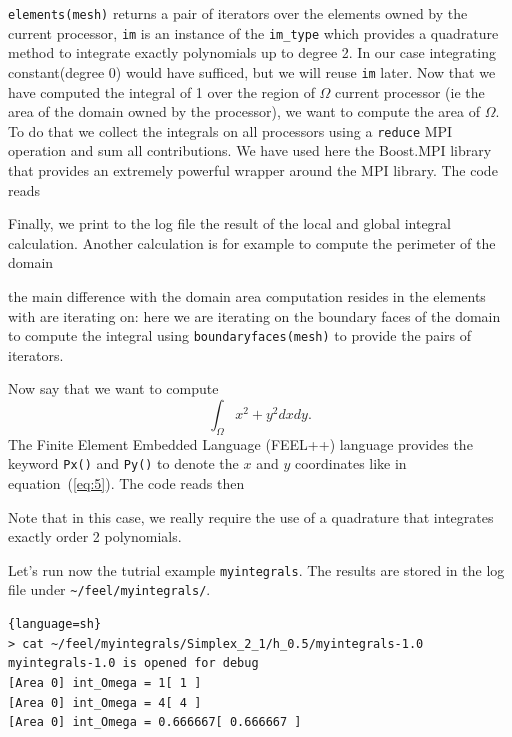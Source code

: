 \lstinline!elements(mesh)! returns a pair of iterators over the
elements owned by the current processor, \lstinline!im! is an instance
of the \lstinline!im_type! which provides a quadrature method to
integrate exactly polynomials up to degree 2. In our case integrating
constant(degree 0) would have sufficed, but we will reuse
\lstinline!im! later. Now that we have computed the integral of 1 over
the region of $\Omega$ current processor (ie the area of the domain
owned by the processor), we want to compute the area of $\Omega$. To
do that we collect the integrals on all processors using a
\lstinline!reduce! MPI operation and sum all contributions. We have
used here the Boost.MPI library that provides an extremely powerful
\cpp wrapper around the MPI library. The code reads



\noindent
Finally, we print to the log file the result of the local and global
integral calculation. Another calculation is for example to compute
the perimeter of the domain



\noindent
the main difference with the domain area computation resides in the
elements with are iterating on: here we are iterating on the boundary
faces of the domain to compute the integral using
\lstinline!boundaryfaces(mesh)! to provide the pairs of iterators.


Now say that we want to compute
\begin{equation}
  \label{eq:5}
  \int_\Omega x^2 + y^2 dx dy.
\end{equation}
The Finite Element Embedded Language (FEEL++) language provides the
keyword \lstinline!Px()! and \lstinline!Py()! to denote the $x$ and
$y$ coordinates like in equation~(\ref{eq:5}).  The code reads then




Note that in this case, we really require the use of a quadrature that
integrates exactly order 2 polynomials.

Let's run now the tutrial example \lstinline!myintegrals!. The results are stored
in the log file under \lstinline!~/feel/myintegrals/!.

\begin{lstlisting}{language=sh}
> cat ~/feel/myintegrals/Simplex_2_1/h_0.5/myintegrals-1.0
myintegrals-1.0 is opened for debug
[Area 0] int_Omega = 1[ 1 ]
[Area 0] int_Omega = 4[ 4 ]
[Area 0] int_Omega = 0.666667[ 0.666667 ]
\end{lstlisting}

